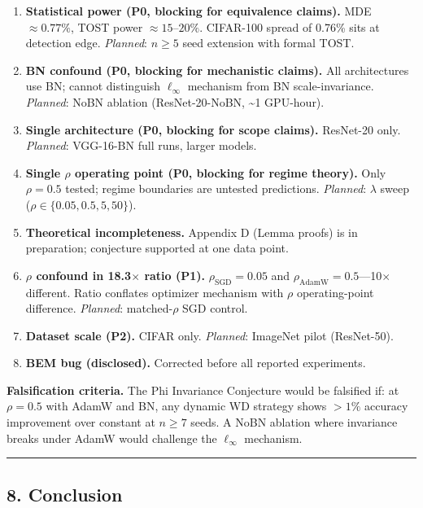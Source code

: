 \documentclass[
]{article}
\begin{document}
\begin{enumerate}
\def\labelenumi{\arabic{enumi}.}
\item
  \textbf{Statistical power (P0, blocking for equivalence claims).} MDE
  \(\approx 0.77\%\), TOST power \(\approx 15\)--\(20\%\). CIFAR-100
  spread of 0.76\% sits at detection edge. \emph{Planned}: \(n \geq 5\)
  seed extension with formal TOST.
\item
  \textbf{BN confound (P0, blocking for mechanistic claims).} All
  architectures use BN; cannot distinguish \(\ell_\infty\) mechanism
  from BN scale-invariance. \emph{Planned}: NoBN ablation
  (ResNet-20-NoBN, \textasciitilde1 GPU-hour).
\item
  \textbf{Single architecture (P0, blocking for scope claims).}
  ResNet-20 only. \emph{Planned}: VGG-16-BN full runs, larger models.
\item
  \textbf{Single \(\rho\) operating point (P0, blocking for regime
  theory).} Only \(\rho = 0.5\) tested; regime boundaries are untested
  predictions. \emph{Planned}: \(\lambda\) sweep
  (\(\rho \in \{0.05, 0.5, 5, 50\}\)).
\item
  \textbf{Theoretical incompleteness.} Appendix D (Lemma proofs) is in
  preparation; conjecture supported at one data point.
\item
  \textbf{\(\rho\) confound in 18.3\(\times\) ratio (P1).}
  \(\rho_{\text{SGD}} = 0.05\) and
  \(\rho_{\text{AdamW}} = 0.5\)---10\(\times\) different. Ratio
  conflates optimizer mechanism with \(\rho\) operating-point
  difference. \emph{Planned}: matched-\(\rho\) SGD control.
\item
  \textbf{Dataset scale (P2).} CIFAR only. \emph{Planned}: ImageNet
  pilot (ResNet-50).
\item
  \textbf{BEM bug (disclosed).} Corrected before all reported
  experiments.
\end{enumerate}

\textbf{Falsification criteria.} The Phi Invariance Conjecture would be
falsified if: at \(\rho = 0.5\) with AdamW and BN, any dynamic WD
strategy shows \(> 1\%\) accuracy improvement over constant at
\(n \geq 7\) seeds. A NoBN ablation where invariance breaks under AdamW
would challenge the \(\ell_\infty\) mechanism.

\begin{center}\rule{0.5\linewidth}{0.5pt}\end{center}

\hypertarget{conclusion}{%
\subsection{8. Conclusion}\label{conclusion}}
\end{document}
